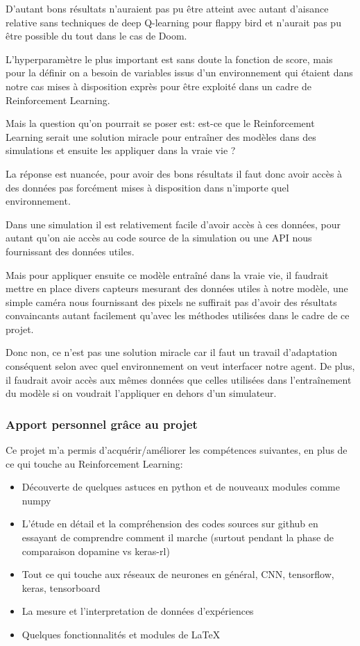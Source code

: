 \documentclass[a4paper,10pt,openany,oneside]{report}
\begin{document}
D'autant bons résultats n'auraient pas pu être atteint avec autant d'aisance relative sans techniques de deep Q-learning pour flappy bird et n'aurait pas pu être possible du tout dans le cas de Doom.

L'hyperparamètre le plus important est sans doute la fonction de score, mais pour la définir on a besoin de variables issus d'un environnement qui étaient dans notre cas mises à disposition exprès pour être exploité dans un cadre de Reinforcement Learning. 

Mais la question qu'on pourrait se poser est: est-ce que le Reinforcement Learning serait une solution miracle pour entraîner des modèles dans des simulations et ensuite les appliquer dans la vraie vie ?

La réponse est nuancée, pour avoir des bons résultats il faut donc avoir accès à des données pas forcément mises à disposition dans n'importe quel environnement.

Dans une simulation il est relativement facile d'avoir accès à ces données, pour autant qu'on aie accès au code source de la simulation ou une API nous fournissant des données utiles.

Mais pour appliquer ensuite ce modèle entraîné dans la vraie vie, il faudrait mettre en place divers capteurs mesurant des données utiles à notre modèle, une simple caméra nous fournissant des pixels ne suffirait pas d'avoir des résultats convaincants autant facilement qu'avec les méthodes utilisées dans le cadre de ce projet.

Donc non, ce n'est pas une solution miracle car il faut un travail d'adaptation conséquent selon avec quel environnement on veut interfacer notre agent. De plus, il faudrait avoir accès aux mêmes données que celles utilisées dans l'entraînement du modèle si on voudrait l'appliquer en dehors d'un simulateur.
\subsubsection*{Apport personnel grâce au projet}
Ce projet m'a permis d'acquérir/améliorer les compétences suivantes, en plus de ce qui touche au Reinforcement Learning:
\begin{itemize}
	\item Découverte de quelques astuces en python et de nouveaux modules comme numpy
	\item L'étude en détail et la compréhension des codes sources sur github en essayant de comprendre comment il marche (surtout pendant la phase de comparaison dopamine vs keras-rl)
	\item Tout ce qui touche aux réseaux de neurones en général, CNN, tensorflow, keras, tensorboard
	\item La mesure et l'interpretation de données d'expériences
	\item Quelques fonctionnalités et modules de LaTeX
\end{itemize}
\end{document}
